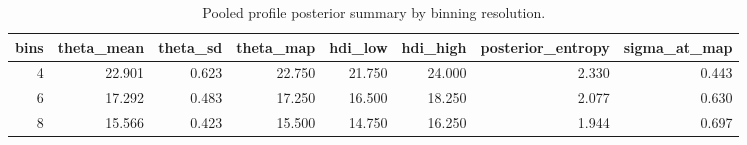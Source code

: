\begin{table}
\caption{Pooled profile posterior summary by binning resolution.}
\label{tab:ext-posterior-bins}
\begin{tabular}{rrrrrrrr}
\toprule
bins & theta_mean & theta_sd & theta_map & hdi_low & hdi_high & posterior_entropy & sigma_at_map \\
\midrule
4 & 22.901 & 0.623 & 22.750 & 21.750 & 24.000 & 2.330 & 0.443 \\
6 & 17.292 & 0.483 & 17.250 & 16.500 & 18.250 & 2.077 & 0.630 \\
8 & 15.566 & 0.423 & 15.500 & 14.750 & 16.250 & 1.944 & 0.697 \\
\bottomrule
\end{tabular}
\end{table}
